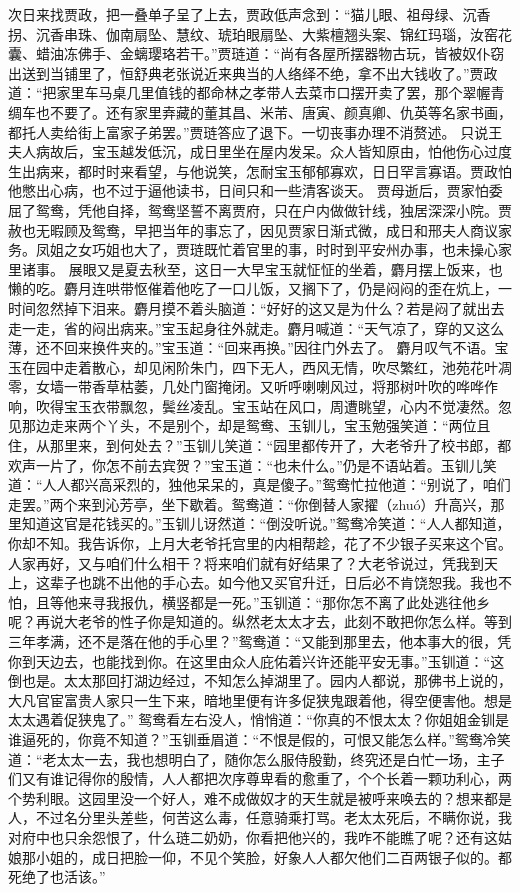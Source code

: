 \documentclass[12pt,oneside]{book}
\begin{document}
次日来找贾政，把一叠单子呈了上去，贾政低声念到：“猫儿眼、祖母绿、沉香拐、沉香串珠、伽南扇坠、慧纹、琥珀眼扇坠、大紫檀翘头案、锦红玛瑙，汝窑花囊、蜡油冻佛手、金螭璎珞若干。”贾琏道：“尚有各屋所摆器物古玩，皆被奴仆窃出送到当铺里了，恒舒典老张说近来典当的人络绎不绝，拿不出大钱收了。”贾政道：“把家里车马桌几里值钱的都命林之孝带人去菜市口摆开卖了罢，那个翠幄青绸车也不要了。还有家里弆藏的董其昌、米芾、唐寅、颜真卿、仇英等名家书画，都托人卖给街上富家子弟罢。”贾琏答应了退下。一切丧事办理不消赘述。
只说王夫人病故后，宝玉越发低沉，成日里坐在屋内发呆。众人皆知原由，怕他伤心过度生出病来，都时时来看望，与他说笑，怎耐宝玉郁郁寡欢，日日罕言寡语。贾政怕他憋出心病，也不过于逼他读书，日间只和一些清客谈天。
贾母逝后，贾家怕委屈了鸳鸯，凭他自择，鸳鸯坚誓不离贾府，只在户内做做针线，独居深深小院。贾赦也无暇顾及鸳鸯，早把当年的事忘了，因见贾家日渐式微，成日和邢夫人商议家务。凤姐之女巧姐也大了，贾琏既忙着官里的事，时时到平安州办事，也未操心家里诸事。
展眼又是夏去秋至，这日一大早宝玉就怔怔的坐着，麝月摆上饭来，也懒的吃。麝月连哄带怄催着他吃了一口儿饭，又搁下了，仍是闷闷的歪在炕上，一时间忽然掉下泪来。麝月摸不着头脑道：“好好的这又是为什么？若是闷了就出去走一走，省的闷出病来。”宝玉起身往外就走。麝月喊道：“天气凉了，穿的又这么薄，还不回来换件夹的。”宝玉道：“回来再换。”因往门外去了。
麝月叹气不语。宝玉在园中走着散心，却见闲阶朱门，四下无人，西风无情，吹尽繁红，池苑花叶凋零，女墙一带香草枯萎，几处门窗掩闭。又听呼喇喇风过，将那树叶吹的哗哗作响，吹得宝玉衣带飘忽，鬓丝凌乱。宝玉站在风口，周遭眺望，心内不觉凄然。忽见那边走来两个丫头，不是别个，却是鸳鸯、玉钏儿，宝玉勉强笑道：“两位且住，从那里来，到何处去？”玉钏儿笑道：“园里都传开了，大老爷升了校书郎，都欢声一片了，你怎不前去宾贺？”宝玉道：“也未什么。”仍是不语站着。玉钏儿笑道：“人人都兴高采烈的，独他呆呆的，真是傻子。”鸳鸯忙拉他道：“别说了，咱们走罢。”两个来到沁芳亭，坐下歇着。鸳鸯道：“你倒替人家擢（zhuó）升高兴，那里知道这官是花钱买的。”玉钏儿讶然道：“倒没听说。”鸳鸯冷笑道：“人人都知道，你却不知。我告诉你，上月大老爷托宫里的内相帮趁，花了不少银子买来这个官。人家再好，又与咱们什么相干？将来咱们就有好结果了？大老爷说过，凭我到天上，这辈子也跳不出他的手心去。如今他又买官升迁，日后必不肯饶恕我。我也不怕，且等他来寻我报仇，横竖都是一死。”玉钏道：“那你怎不离了此处逃往他乡呢？再说大老爷的性子你是知道的。纵然老太太才去，此刻不敢把你怎么样。等到三年孝满，还不是落在他的手心里？”鸳鸯道：“又能到那里去，他本事大的很，凭你到天边去，也能找到你。在这里由众人庇佑着兴许还能平安无事。”玉钏道：“这倒也是。太太那回打湖边经过，不知怎么掉湖里了。园内人都说，那佛书上说的，大凡官宦富贵人家只一生下来，暗地里便有许多促狭鬼跟着他，得空便害他。想是太太遇着促狭鬼了。”
鸳鸯看左右没人，悄悄道：“你真的不恨太太？你姐姐金钏是谁逼死的，你竟不知道？”玉钏垂眉道：“不恨是假的，可恨又能怎么样。”鸳鸯冷笑道：“老太太一去，我也想明白了，随你怎么服侍殷勤，终究还是白忙一场，主子们又有谁记得你的殷情，人人都把次序尊卑看的愈重了，个个长着一颗功利心，两个势利眼。这园里没一个好人，难不成做奴才的天生就是被呼来唤去的？想来都是人，不过名分里头差些，何苦这么毒，任意骑乘打骂。老太太死后，不瞒你说，我对府中也只余怨恨了，什么琏二奶奶，你看把他兴的，我咋不能瞧了呢？还有这姑娘那小姐的，成日把脸一仰，不见个笑脸，好象人人都欠他们二百两银子似的。都死绝了也活该。”
\end{document}
